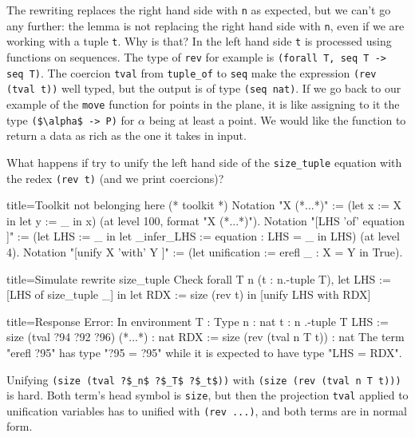 The rewriting replaces the right hand side with \lstinline/n/ as
expected, but we can't go any further: the lemma is not replacing
the right hand side with \lstinline/n/, even if we are working
with a tuple \lstinline/t/.  Why is that?  In the left hand side
\lstinline/t/ is processed using functions on sequences.
The type of \lstinline/rev/ for example is
\lstinline/(forall T, seq T -> seq T)/.  The coercion \lstinline/tval/
from \lstinline/tuple_of/ to \lstinline/seq/ make the
expression \lstinline/(rev (tval t))/ well typed, but the output
is of type \lstinline/(seq nat)/.  If we go back to our example
of the \lstinline/move/ function for points in the plane, it is like
assigning to it the type \lstinline/($\alpha$ -> P)/ for $\alpha$
being at least a point.  We would like the function to return
a data as rich as the one it takes in input.

What happens if try to unify the left hand side of the
\lstinline/size_tuple/ equation with the redex
\lstinline/(rev t)/ (and we print coercions)?

\begin{coq}{title=Toolkit not belonging here}
(* toolkit *)
Notation "X (*...*)" := (let x := X in let y := _ in x)
  (at level 100, format "X  (*...*)").
Notation "[LHS 'of' equation ]" :=
  (let LHS := _ in
   let _infer_LHS := equation : LHS = _ in LHS)
  (at level 4).
Notation "[unify X 'with' Y ]" :=
  (let unification := erefl _ : X = Y in
   True).
\end{coq}

\begin{coq}{title=Simulate rewrite size\_tuple}
Check forall T n (t : n.-tuple T),
 let LHS := [LHS of size_tuple _] in
 let RDX := size (rev t) in
 [unify LHS with RDX]
\end{coq}

\begin{coq}{title=Response}
Error:
In environment
T : Type
n : nat
t : n .-tuple T
LHS := size (tval ?94 ?92 ?96) (*...*) : nat
RDX := size (rev (tval n T t))           : nat
The term "erefl ?95" has type "?95 = ?95" while
it is expected to have type "LHS = RDX".
\end{coq}

Unifying \lstinline/(size (tval ?$_n$ ?$_T$ ?$_t$))/
with \lstinline/(size (rev (tval n T t)))/ is hard.
Both term's head symbol is \lstinline/size/, but then
the projection \lstinline/tval/ applied to unification
variables has to unified with \lstinline/(rev ...)/,
and both terms are in normal form.

